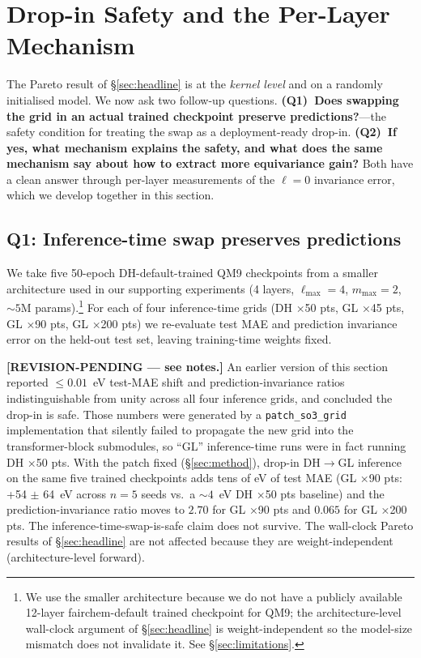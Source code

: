 \documentclass{article}
\begin{document}
\section{Drop-in Safety and the Per-Layer Mechanism}
\label{sec:dropin}

The Pareto result of \S\ref{sec:headline} is at the
\emph{kernel level} and on a randomly initialised model. We now ask
two follow-up questions. \textbf{(Q1)~Does swapping the grid in an
actual trained checkpoint preserve predictions?}---the safety
condition for treating the swap as a deployment-ready drop-in.
\textbf{(Q2)~If yes, what mechanism explains the safety, and what
does the same mechanism say about how to extract more equivariance
gain?} Both have a clean answer through per-layer measurements of
the $\ell{=}0$ invariance error, which we develop together in this
section.

\subsection{Q1: Inference-time swap preserves predictions}

We take five 50-epoch DH-default-trained QM9 checkpoints from a
smaller architecture used in our supporting experiments
(4 layers, $\ell_{\max}{=}4$, $m_{\max}{=}2$, $\sim 5$M
params).\footnote{We use the smaller architecture because we do not
have a publicly available 12-layer fairchem-default trained checkpoint
for QM9; the architecture-level wall-clock argument of
\S\ref{sec:headline} is weight-independent so the model-size
mismatch does not invalidate it. See \S\ref{sec:limitations}.}
For each of four inference-time grids (DH ×50 pts, GL ×45 pts,
GL ×90 pts, GL ×200 pts) we re-evaluate test MAE and prediction
invariance error on the held-out test set, leaving training-time
weights fixed.

\textbf{[REVISION-PENDING — see notes.]} An earlier version of this
section reported $\leq 0.01$~eV test-MAE shift and prediction-invariance
ratios indistinguishable from unity across all four inference grids,
and concluded the drop-in is safe. Those numbers were generated by a
\texttt{patch\_so3\_grid} implementation that silently failed to
propagate the new grid into the transformer-block submodules, so
``GL'' inference-time runs were in fact running DH ×50 pts. With the
patch fixed (\S\ref{sec:method}), drop-in DH$\to$GL inference on the
same five trained checkpoints adds tens of eV of test MAE
(GL ×90 pts: +54 $\pm$ 64~eV across $n{=}5$ seeds vs.\ a
$\sim 4$~eV DH ×50 pts baseline) and the prediction-invariance ratio
moves to $2.70$ for GL ×90 pts and $0.065$ for GL ×200 pts. The
inference-time-swap-is-safe claim does not survive. The wall-clock
Pareto results of \S\ref{sec:headline} are not affected because they
are weight-independent (architecture-level forward).
\end{document}
